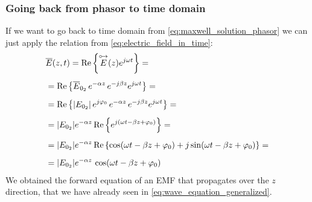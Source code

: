 \subsubsection*{Going back from phasor to time domain}
If we want to go back to time domain from \cref{eq:maxwell_solution_phasor} we can just apply the relation from \cref{eq:electric_field_in_time}:
\begin{align}
    \begin{split}
        &\overline{E}(z,t)=\operatorname{Re}\left\{\overset{\mathbin {{\circ \mkern-2.5mu\rightarrow}}}{E}(z)e^{j\omega t}\right\}=\\[5pt]
        &=\operatorname{Re}\left\{\overline{E}_{0_2}\,e^{-\alpha z}\,e^{-j\beta z}e^{j\omega t}\right\} =\\[5pt]
        &=\operatorname{Re}\left\{|E_{0_2}|\,e^{j\varphi_0}\,e^{-\alpha z}\,e^{-j\beta z}e^{j\omega t}\right\} =\\[5pt]
        &= |E_{0_2}| e^{-\alpha z}\operatorname{Re}\left\{e^{j(\omega t-\beta z +\varphi_0)}\right\}=\\[5pt]
        &= |E_{0_2}| e^{-\alpha z}\operatorname{Re}\left\{\cos(\omega t-\beta z +\varphi_0)+j \sin(\omega t-\beta z +\varphi_0)\right\}=\\[5pt]
        &= |E_{0_2}| e^{-\alpha z}\,\cos(\omega t-\beta z +\varphi_0)
    \end{split}\label{eq:from_phas_to_time}
\end{align}
We obtained the forward equation of an EMF that propagates over the $z$ direction, that we have already seen in \cref{eq:wave_equation_generalized}.
